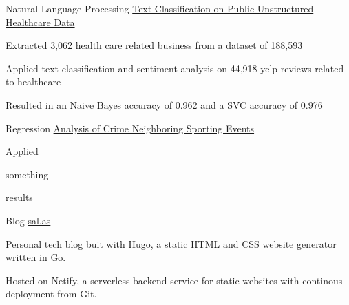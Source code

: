 

\begin{cventries}

  \cventrynodate
    {Natural Language Processing} %
    {\href{https://github.com/franksalas/text_classification_public_healthcare_data}{Text Classification on Public Unstructured Healthcare Data
        }
    }
    {} %
    {}
    {
      \begin{cvitems} %
        \item {Extracted 3,062 health care related business from a dataset of 188,593}
        \item {Applied text classification and sentiment analysis on  44,918 yelp reviews related to healthcare}
        \item {Resulted in an Naive Bayes accuracy of 0.962 and a SVC accuracy of 0.976}
      \end{cvitems}
    }



  \cventrynodate
    {Regression} %
    {\href{https://github.com/franksalas/SpringboardCapstone}{Analysis of Crime Neighboring Sporting Events}} %
    {} %
    {} %
    {
      \begin{cvitems} %
        \item {Applied}
        \item {something}
        \item {results}
      \end{cvitems}
    }

  \cventrynodate
    {Blog} %
    {\href{https://github.com/franksalas/blog}{sal.as}} %
    {} %
    {} %
    {
      \begin{cvitems} %
        \item {Personal tech blog buit with Hugo, a static HTML and CSS website generator written in Go.}
        \item {Hosted on Netify, a serverless backend service for static websites with continous deployment from Git.}
      \end{cvitems}
    }
	\vspace*{-4mm}
\end{cventries}
